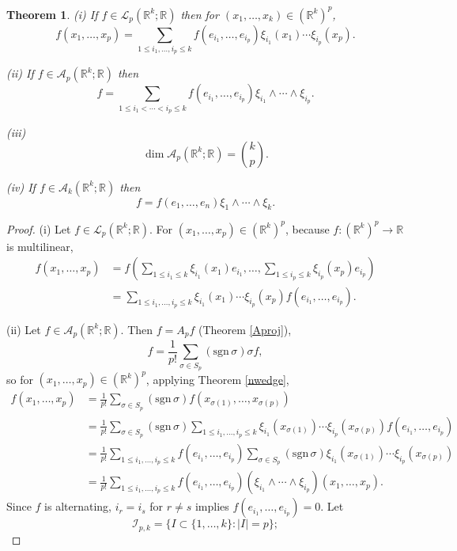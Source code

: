 \documentclass{article}
\newcommand{\sgn}{\mathrm{sgn}\,}
\newtheorem{theorem}{Theorem}
\theoremstyle{definition}
\begin{document}
\begin{theorem}
(i) If $f \in \mathscr{L}_p(\mathbb{R}^k;\mathbb{R})$ then for $(x_1,\ldots,x_k) \in (\mathbb{R}^k)^p$,
\[
f(x_1,\ldots,x_p) =\sum_{1 \leq i_1, \ldots, i_p \leq k} f(e_{i_1}, \ldots,e_{i_p}) \xi_{i_1}(x_1)\cdots \xi_{i_p}(x_p).
\]

(ii) If $f \in \mathscr{A}_p(\mathbb{R}^k;\mathbb{R})$ then
\[
f = \sum_{1 \leq i_1 < \cdots < i_p \leq k} f(e_{i_1}, \ldots,e_{i_p}) \xi_{i_1} \wedge \cdots \wedge \xi_{i_p}.
\]

(iii)
\[
\dim \mathscr{A}_p(\mathbb{R}^k;\mathbb{R}) = \binom{k}{p}.
\]

(iv) If $f \in \mathscr{A}_k(\mathbb{R}^k;\mathbb{R})$ then
\[
f = f(e_1,\ldots,e_n) \xi_1 \wedge \cdots \wedge \xi_k.
\]
\label{increasing}
\end{theorem}
\begin{proof}
(i) Let $f \in \mathscr{L}_p(\mathbb{R}^k;\mathbb{R})$. For $(x_1,\ldots,x_p) \in (\mathbb{R}^k)^p$, because $f:(\mathbb{R}^k)^p \to \mathbb{R}$ is multilinear,
\begin{align*}
f(x_1,\ldots,x_p)&=f\left( \sum_{1 \leq i_1 \leq k} \xi_{i_1}(x_1)e_{i_1},
\ldots,\sum_{1 \leq i_p \leq k} \xi_{i_p}(x_p)e_{i_p}\right)\\
&=\sum_{1 \leq i_1, \ldots, i_p \leq k} \xi_{i_1}(x_1)\cdots \xi_{i_p}(x_p) f(e_{i_1},
\ldots,e_{i_p}).
\end{align*}

(ii) Let $f \in \mathscr{A}_p(\mathbb{R}^k;\mathbb{R})$. Then $f=A_pf$ (Theorem \ref{Aproj}),
\[
f = \frac{1}{p!} \sum_{\sigma \in S_p} (\sgn \sigma) \sigma f,
\]
so for $(x_1,\ldots,x_p) \in (\mathbb{R}^k)^p$, applying Theorem \ref{nwedge},
\begin{align*}
f(x_1,\ldots,x_p) &= \frac{1}{p!} \sum_{\sigma \in S_p} (\sgn \sigma) f(x_{\sigma(1)},\ldots,x_{\sigma(p)})\\
&= \frac{1}{p!} \sum_{\sigma \in S_p} (\sgn \sigma) 
\sum_{1 \leq i_1, \ldots, i_p \leq k} \xi_{i_1}(x_{\sigma(1)})\cdots \xi_{i_p}(x_{\sigma(p)}) f(e_{i_1},\ldots,e_{i_p})\\
&=\frac{1}{p!} \sum_{1 \leq i_1, \ldots, i_p \leq k} f(e_{i_1},\ldots,e_{i_p}) \sum_{\sigma \in S_p} (\sgn \sigma) \xi_{i_1}(x_{\sigma(1)})\cdots \xi_{i_p}(x_{\sigma(p)})\\
&=\frac{1}{p!} \sum_{1 \leq i_1, \ldots, i_p \leq k} f(e_{i_1},\ldots,e_{i_p}) (\xi_{i_1} \wedge \cdots \wedge \xi_{i_p})(x_1,\ldots,x_p).
\end{align*}
Since $f$ is alternating, $i_r = i_s$ for $r \neq s$ implies $f(e_{i_1},\ldots,e_{i_p})=0$. 
Let 
\[
\mathscr{I}_{p,k} = \{I \subset \{1,\ldots,k\}: |I|=p\};
\]


\end{proof}
\end{document}
